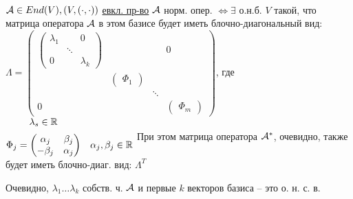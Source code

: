 \documentclass[../main.tex]{subfiles}
\begin{document}
	\begin{theorem}\ \\
		$\mathcal{A} \in End(V), (V, (\cdot, \cdot))$ \underline{евкл. пр-во} \n 
		$\mathcal{A}$ норм. опер. $\Leftrightarrow \exists$ о.н.б. $V$ такой, что матрица оператора $\mathcal{A}$ в этом базисе будет иметь блочно-диагональный вид: \n 
		$\Lambda = \begin{pmatrix}
			\begin{pmatrix}
				\lambda_1 & & 0 \\
				& \ddots \\
				0 & & \lambda_k
			\end{pmatrix} & & &  0\\
			& \begin{pmatrix}
				\Phi_1\end{pmatrix} \\
				& & \ddots\\
				0 & & & \begin{pmatrix}
					\Phi_m
				\end{pmatrix}
		\end{pmatrix}$, где \Space $\begin{matrix}
			\lambda_s \in \R \n 
			\Phi_j = \begin{pmatrix}
				\alpha_j & \beta_j \\
				-\beta_j & \alpha_j
			\end{pmatrix} & \alpha_j, \beta_j \in \R
		\end{matrix} $\n 
		При этом матрица оператора $\mathcal{A}^*$, очевидно, также будет иметь блочно-диаг. вид: $\Lambda^T$
	\end{theorem}
	\begin{remark}
		Очевидно, $\lambda_1 \ldots \lambda_k$ собств. ч. $\mathcal{A}$  и первые $k$ векторов базиса -- это о. н. с. в.
	\end{remark}
\end{document}
